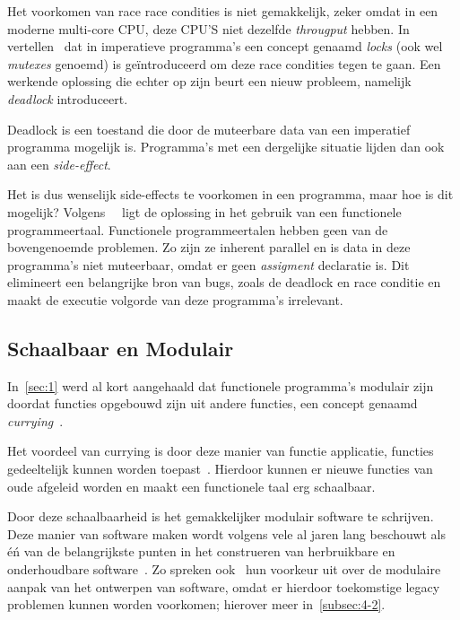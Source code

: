 \documentclass[twoside,twocolumn]{article}
\begin{document}
Het voorkomen van race race condities is niet gemakkelijk, zeker omdat in een
moderne multi-core CPU, deze CPU'S niet dezelfde \textit{througput} hebben.
In~ vertellen~\citeauthor{src14} dat in imperatieve
programma's een concept genaamd \textit{locks} (ook wel \textit{mutexes}
genoemd) is ge\"introduceerd om deze race condities tegen te gaan. Een werkende
oplossing die echter op zijn beurt een nieuw probleem, namelijk
\textit{deadlock} introduceert.

Deadlock is een  toestand die door de muteerbare data van een imperatief
programma mogelijk is. Programma's met een dergelijke situatie lijden dan ook
aan een \textit{side-effect}.

Het is dus wenselijk side-effects te voorkomen in een programma, maar hoe is
dit mogelijk? Volgens~\citeauthor{src14}~\cite{src14,src15} ligt de oplossing
in het gebruik van een functionele programmeertaal. Functionele
programmeertalen hebben geen van de bovengenoemde problemen. Zo zijn ze
inherent parallel en is data in deze programma's niet muteerbaar, omdat er geen
\textit{assigment} declaratie is. Dit elimineert een belangrijke bron van bugs,
zoals de deadlock en race conditie en maakt de executie volgorde van deze
programma's irrelevant.

\subsection{Schaalbaar en Modulair}
\label{subsec:3-2}

In~\cref{sec:1} werd al kort aangehaald dat functionele programma's modulair
zijn doordat functies opgebouwd zijn uit andere functies, een concept genaamd
\textit{currying}~\cite[hfdst.~5]{src16}.

Het voordeel van currying is door deze manier van functie applicatie, functies
gedeeltelijk kunnen worden toepast~\cite{src1}. Hierdoor kunnen er nieuwe
functies van oude afgeleid worden en maakt een functionele taal erg schaalbaar.

Door deze schaalbaarheid is het gemakkelijker modulair software te schrijven.
Deze manier van software maken wordt volgens vele al jaren lang beschouwt als
\'e\'n van de belangrijkste punten in het construeren van herbruikbare en
onderhoudbare software~\cite{src17}. Zo spreken ook~\textcite{src18} hun
voorkeur uit over de modulaire aanpak van het ontwerpen van software, omdat er
hierdoor toekomstige legacy problemen kunnen worden voorkomen; hierover meer
in~\cref{subsec:4-2}.
\end{document}

